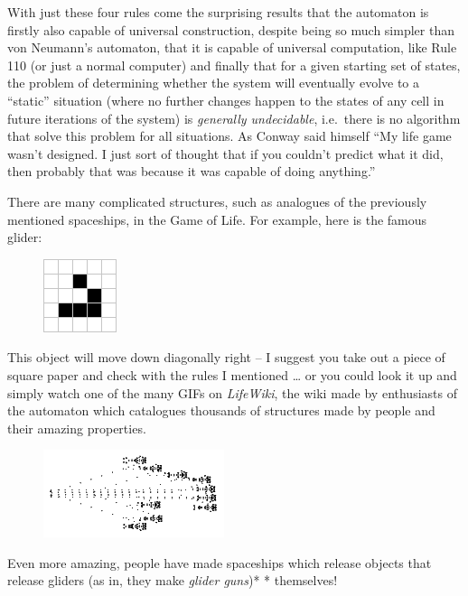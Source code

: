 With just these four rules come the surprising results that the
automaton is firstly also capable of universal construction, despite
being so much simpler than von Neumann's automaton, that it is capable
of universal computation, like Rule 110 (or just a normal computer) and
finally that for a given starting set of states, the problem of
determining whether the system will eventually evolve to a ``static''
situation (where no further changes happen to the states of any cell in
future iterations of the system) is \emph{generally undecidable},
i.e.~there is no algorithm that solve this problem for all situations.
As Conway said himself ``My life game wasn't designed. I just sort of
thought that if you couldn't predict what it did, then probably that was
because it was capable of doing anything.''

There are many complicated structures, such as analogues of the
previously mentioned spaceships, in the Game of Life. For example, here
is the famous glider:

\begin{figure}[htbp]
\centering
\includegraphics{image_4.png}
\caption{}
\end{figure}

This object will move down diagonally right -- I suggest you take out a
piece of square paper and check with the rules I mentioned \ldots{} or
you could look it up and simply watch one of the many GIFs on
\emph{LifeWiki}, the wiki made by enthusiasts of the automaton which
catalogues thousands of structures made by people and their amazing
properties.

\begin{figure}[htbp]
\centering
\includegraphics{image_5.png}
\caption{}
\end{figure}

Even more amazing, people have made spaceships which release objects
that release gliders (as in, they make \emph{glider guns})* *
themselves!

